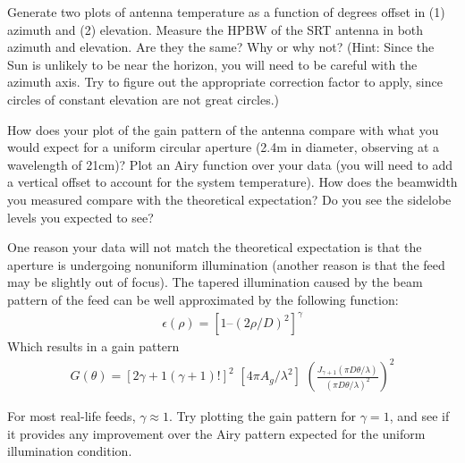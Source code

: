 \documentclass[12pt]{article}
\newenvironment{part}[2][Part]{\begin{trivlist}
\item[\hskip \labelsep {\bfseries #1}\hskip \labelsep {\bfseries #2.}]}{\end{trivlist}}
\begin{document}
\begin{part}{Measure Antenna Beamwidth using the Sun as a Signal Source}
  Generate two plots of antenna temperature as a function of degrees offset in (1) azimuth and (2) elevation. Measure the HPBW of the SRT antenna in both azimuth and elevation. Are they the same? Why or why not? (Hint: Since the Sun is unlikely to be near the horizon, you will need to be careful with the azimuth axis. Try to figure out the appropriate correction factor to apply, since circles of constant elevation are not great circles.)
  \bigskip

  How does your plot of the gain pattern of the antenna compare with what you would expect for a uniform circular aperture (2.4m in diameter, observing at a wavelength of 21cm)? Plot an Airy function over your data (you will need to add a vertical offset to account for the system temperature). How does the beamwidth you measured compare with the theoretical expectation? Do you see the sidelobe levels you expected to see?
  \bigskip

  One reason your data will not match the theoretical expectation is that the aperture is undergoing nonuniform illumination (another reason is that the feed may be slightly out of focus). The tapered illumination caused by the beam pattern of the feed can be well approximated by the following function:
  \begin{align*}
    \epsilon(\rho) = [1 – (2\rho/D)^2]^{\gamma}
  \end{align*}
  Which results in a gain pattern
  \begin{align*}
    G(\theta) = [2\gamma+1 (\gamma+1)!]^2 \,\, [4\pi A_g / \lambda^2] \,\, \left(\frac{J_{\gamma+1}(\pi D \theta/\lambda)}{(\pi D \theta/\lambda)^2} \right) ^2
  \end{align*}
  \bigskip

  For most real-life feeds, $\gamma \approx 1$. Try plotting the gain pattern for $\gamma = 1$, and see if it provides any improvement over the Airy pattern expected for the uniform illumination condition.
\end{part}
\end{document}
